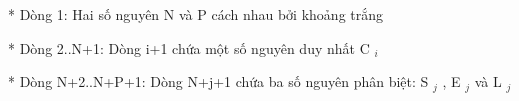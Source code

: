 * Dòng 1: Hai số nguyên N và P cách nhau bởi khoảng trắng  

   * Dòng 2..N+1: Dòng i+1 chứa một số nguyên duy nhất C   $_    i   $

   * Dòng N+2..N+P+1: Dòng N+j+1 chứa ba số nguyên phân biệt: S   $_    j   $   , E   $_    j   $   và L   $_    j   $